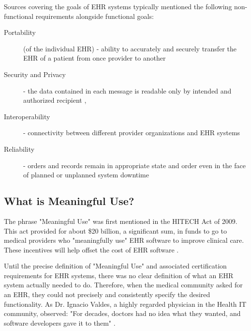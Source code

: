 \documentclass[10pt]{article}
\begin{document}
Sources covering the goals of EHR systems typically mentioned the following non-functional requirements alongside functional goals:

\begin{description}
	\item[Portability] (of the individual EHR) - ability to accurately and securely transfer the EHR of a patient from once provider to another \cite{ehrbook}
	\item[Security and Privacy] - the data contained in each message is readable only by intended and authorized recipient \cite{ehrbook}, \cite{auditingprivacy}
	\item[Interoperability] - connectivity between different provider organizations and EHR systems \cite{ehrbook}
	\item[Reliability] - orders and records remain in appropriate state and order even in the face of planned or unplanned system downtime  \cite{ehrbook}
\end{description}




\subsection{What is Meaningful Use?}
\label{sec:Define Meaningful Use}

The phrase "Meaningful Use" was first mentioned in the HITECH Act of 2009.
This act provided for about \$20 billion, a significant sum, in funds to go to medical providers who "meaningfully use" EHR software to improve clinical care.
These incentives will help offset the cost of EHR software \cite{health-hack}.

Until the precise definition of "Meaningful Use" and associated certification requirements for EHR systems, there was no clear definition of what an EHR system actually needed to do.
Therefore, when the medical community asked for an EHR, they could not precisely and consistently specify the desired functionality.
As Dr. Ignacio Valdes, a highly regarded physician in the Health IT community, observed: "For decades, doctors had no idea what they wanted, and software developers gave it to them" \cite{health-hack}.
\end{document}
